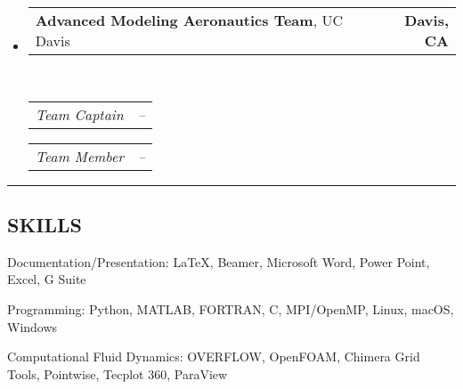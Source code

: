 \documentclass[10pt,letterpaper,MMMyyyy,nonstop]{simpleresumecv}
\makeatletter
\newenvironment{indentsection}[1]%
{\begin{list}{}%
    {\setlength{\leftmargin}{#1}}%
    \item[]%
}
{\end{list}}
\newcommand{\headerrow}[2]
{\begin{tabular*}{\linewidth}{l@{\extracolsep{\fill}}r}
    #1 &
    #2 \\
\end{tabular*}}
\newcommand{\CPP}
{C\nolinebreak[4]\hspace{-.05em}\raisebox{.22ex}{\footnotesize\bf ++}}
\makeatother
\begin{document}
\begin{itemize}
    \item
        \headerrow
        {\textbf{Advanced Modeling Aeronautics Team}, UC Davis}
        {\textbf{Davis, CA}}
        \\
        \headerrow
        {\emph{Team Captain}}
        {\emph{\DatestampY{2012} -- \DatestampY{2013}}}

        \headerrow
        {\emph{Team Member}}
        {\emph{\DatestampY{2011} -- \DatestampY{2012}}}



\end{itemize}







\hrule
\vspace{-0.4em}
\subsection*{SKILLS}

\begin{indentsection}{\parindent}
    \begin{description*}
        \item[Documentation/Presentation:]
        {\LaTeX}, Beamer, Microsoft Word, Power Point, Excel, G Suite
        \item[Programming:]
        Python, MATLAB, FORTRAN, \CPP, MPI/OpenMP, Linux, macOS, Windows
        \item[Computational Fluid Dynamics:]
        OVERFLOW, OpenFOAM, Chimera Grid Tools, Pointwise, Tecplot 360, ParaView
    \end{description*}
\end{indentsection}
\end{document}
